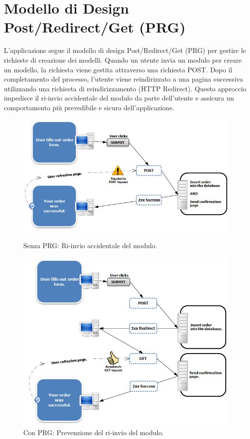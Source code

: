 \documentclass{rapportECL}
\begin{document}
\section{Modello di Design Post/Redirect/Get (PRG)}
L'applicazione segue il modello di design Post/Redirect/Get (PRG) per gestire le richieste di creazione dei modelli. 
Quando un utente invia un modulo per creare un modello, la richiesta viene gestita attraverso una richiesta POST. Dopo il completamento del processo, 
l'utente viene reindirizzato a una pagina successiva utilizzando una richiesta di reindirizzamento (HTTP Redirect). 
Questo approccio impedisce il ri-invio accidentale del modulo da parte dell'utente e assicura un comportamento più prevedibile e sicuro dell'applicazione.


\begin{figure}[htp]
  \begin{minipage}[b]{0.5\linewidth}
  \centering
  \includegraphics[width=\linewidth]{images/img8.png}
  \caption{Senza PRG: Ri-invio accidentale del modulo.}
  \end{minipage}
  \hspace{0.5cm}
  \begin{minipage}[b]{0.5\linewidth}
  \centering
  \includegraphics[width=\linewidth]{images/img5.png}
  \caption{Con PRG: Prevenzione del ri-invio del modulo.}
  \end{minipage}
  \end{figure}
\end{document}
